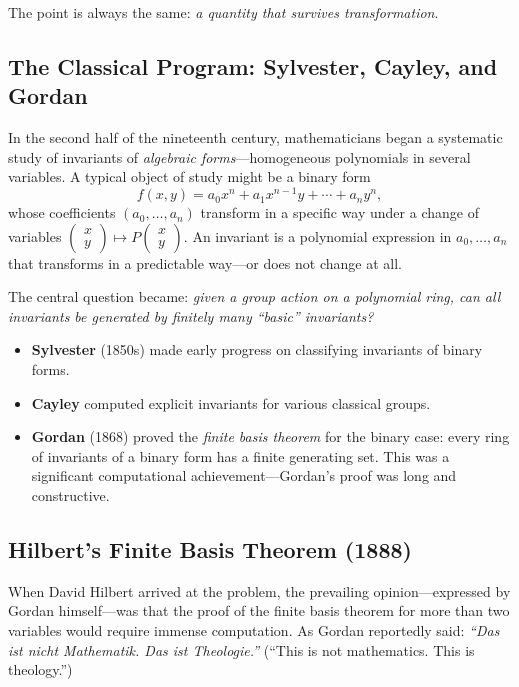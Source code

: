The point is always the same: \emph{a quantity that survives transformation}.

\subsection{The Classical Program: Sylvester, Cayley, and Gordan}

In the second half of the nineteenth century, mathematicians began a systematic study of invariants of \emph{algebraic forms}---homogeneous polynomials in several variables. A typical object of study might be a binary form
\[
    f(x,y) = a_0 x^n + a_1 x^{n-1} y + \cdots + a_n y^n,
\]
whose coefficients $(a_0, \ldots, a_n)$ transform in a specific way under a change of variables $\begin{pmatrix} x \\ y \end{pmatrix} \mapsto P \begin{pmatrix} x \\ y \end{pmatrix}$. An invariant is a polynomial expression in $a_0, \ldots, a_n$ that transforms in a predictable way---or does not change at all.

The central question became: \emph{given a group action on a polynomial ring, can all invariants be generated by finitely many ``basic'' invariants?}

\begin{itemize}
    \item \textbf{Sylvester} (1850s) made early progress on classifying invariants of binary forms.
    \item \textbf{Cayley} computed explicit invariants for various classical groups.
    \item \textbf{Gordan} (1868) proved the \emph{finite basis theorem} for the binary case: every ring of invariants of a binary form has a finite generating set. This was a significant computational achievement---Gordan's proof was long and constructive.
\end{itemize}

\subsection{Hilbert's Finite Basis Theorem (1888)}

When David Hilbert arrived at the problem, the prevailing opinion---expressed by Gordan himself---was that the proof of the finite basis theorem for more than two variables would require immense computation. As Gordan reportedly said: \emph{``Das ist nicht Mathematik. Das ist Theologie.''} (``This is not mathematics. This is theology.'')

